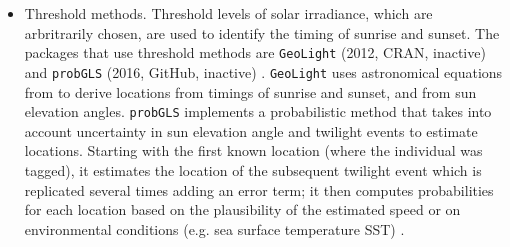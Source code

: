 \documentclass[a4paper,12pt]{article}
\newcommand{\Rpkg}[1]{\texttt{#1}}
\begin{document}
	\begin{itemize}
		\item Threshold methods. Threshold levels of solar irradiance, which are arbritrarily chosen, are used to identify the timing of sunrise and sunset. The packages that use threshold methods are \Rpkg{GeoLight} (2012, CRAN, inactive) \citep{Lisovski2012} and \Rpkg{probGLS} (2016, GitHub, inactive) \citep{RprobGLS}. \Rpkg{GeoLight} uses astronomical equations from \cite{Montenbruck2013} to derive locations from timings of sunrise and sunset, and from sun elevation angles. \Rpkg{probGLS} implements a probabilistic method that takes into account uncertainty in sun elevation angle and twilight events to estimate locations. Starting with the first known location (where the individual was tagged), it estimates the location of the subsequent twilight event which is replicated several times adding an error term; it then computes probabilities for each location based on the plausibility of the estimated speed or on environmental conditions (e.g. sea surface temperature SST) \citep{Merkel2016}. 

\end{itemize}
\end{document}
